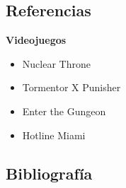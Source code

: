 \documentclass[11pt]{article}
\begin{document}
    \subsection{Referencias}
    
    \textbf{Videojuegos}
    \begin{itemize}
        \item Nuclear Throne \cite{vlaamber}
        \item Tormentor X Punisher \cite{E-Studio}
        \item Enter the Gungeon \cite{ETG}
        \item Hotline Miami \cite{dennaton}
    \end{itemize}

    \newpage
    \subsection{Bibliografía} \label{bibliografia}
        \printbibliography[heading = none]
        \nocite{*}
\end{document}
